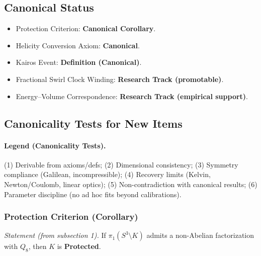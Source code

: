 \documentclass[10pt,reprint,aps,onecolumn,nofootinbib]{revtex4-2}
\begin{document}
    \subsection{Canonical Status}

    \begin{itemize}
        \item Protection Criterion: \textbf{Canonical Corollary}.
        \item Helicity Conversion Axiom: \textbf{Canonical}.
        \item Kairos Event: \textbf{Definition (Canonical)}.
        \item Fractional Swirl Clock Winding: \textbf{Research Track (promotable)}.
        \item Energy–Volume Correspondence: \textbf{Research Track (empirical support)}.
    \end{itemize}

    \subsection{Canonicality Tests for New Items}
    \label{app:knot_protection:tests}

    \paragraph{Legend (Canonicality Tests).}
    (1) Derivable from axioms/defs; (2) Dimensional consistency; (3) Symmetry compliance (Galilean, incompressible);
        (4) Recovery limits (Kelvin, Newton/Coulomb, linear optics); (5) Non-contradiction with canonical results;
        (6) Parameter discipline (no ad hoc fits beyond calibrations).

    \subsubsection{Protection Criterion (Corollary)}
    \emph{Statement (from subsection 1).} If $\pi_1(S^3\!\setminus\!K)$ admits a non-Abelian factorization with $Q_8$, then $K$ is \textbf{Protected}.
\end{document}

